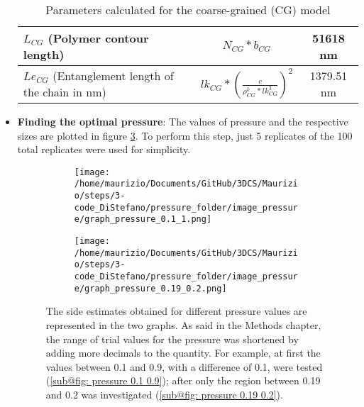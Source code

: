\begin{itemize}
\begin{table}[H]
\begin{tabular}{|l|c|c|}
    \textbf{$L_{CG}$} (Polymer contour length) & $N_{CG} * b_{CG}$& 51618 nm\\
    \hline
    \textbf{$Le_{CG}$} (Entanglement length of the chain in nm) & $lk_{CG} * \left(\frac{c}{\rho^k_{CG} * lk_{CG}^3}\right)^2$ & 1379.51 nm\\
    \hline
    \end{tabular}
    \caption{Parameters calculated for the coarse-grained (CG) model}
    \label{table: parameters CG}
  \end{table}
    
    
    \item \textbf{Finding the optimal pressure}: The values of pressure and the respective sizes are plotted in figure \ref{fig: pressure}. To perform this step, just 5 replicates of the 100 total replicates were used for simplicity.
    
    \begin{figure}[H]
      \centering
      
      \begin{subfigure}{0.40\textwidth}
        \texttt{[image: /home/maurizio/Documents/GitHub/3DCS/Maurizio/steps/3-code\_DiStefano/pressure\_folder/image\_pressure/graph\_pressure\_0.1\_1.png]}
        \caption{}
        \label{fig: pressure 0.1 0.9}
      \end{subfigure}
      \hfill
      \begin{subfigure}{0.40\textwidth}
        \texttt{[image: /home/maurizio/Documents/GitHub/3DCS/Maurizio/steps/3-code\_DiStefano/pressure\_folder/image\_pressure/graph\_pressure\_0.19\_0.2.png]}
        \caption{}
        \label{fig: pressure 0.19 0.2}
      \end{subfigure}
    
      \caption{The side estimates obtained for different pressure values are represented in the two graphs. As said in the Methods chapter, the range of trial values for the pressure was shortened by adding more decimals to the quantity. For example, at first the values between 0.1 and 0.9, with a difference of 0.1, were tested (\ref{sub@fig: pressure 0.1 0.9}); after only the region between 0.19 and 0.2 was investigated (\ref{sub@fig: pressure 0.19 0.2}).}
      \label{fig: pressure}
    \end{figure}
  
  

\end{itemize}


